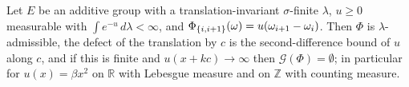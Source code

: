 \begin{example}[Georgii (9.17)]
    \label{ex:sb-9-17}
    \leanok

    Let $E$ be an additive group with a translation-invariant $\sigma$-finite $\lambda$,
    $u \geq 0$ measurable with $\int e^{-u}\,d\lambda < \infty$, and $\Phi_{\left\{ i,i+1 \right\}}(\omega)
    = u(\omega_{i+1} - \omega_i)$. Then $\Phi$ is $\lambda$-admissible, the defect of the
    translation by $c$ is the second-difference bound of $u$ along $c$, and if this is finite and
    $u(x + kc) \to \infty$ then $\mathcal G(\Phi) = \emptyset$; in particular for $u(x) = \beta x^2$
    on $\mathbb R$ with Lebesgue measure and on $\mathbb Z$ with counting measure.
\end{example}
